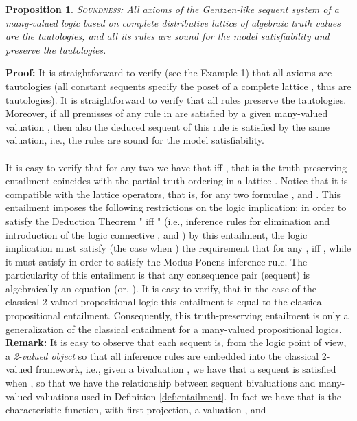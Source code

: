 \documentclass[10pt,twocolumn]{article}
\newtheorem{propo}{Proposition}
\begin{document}
  \begin{propo} \textsc{Soundness:} \label{prop:sound}
 All  axioms of the Gentzen-like sequent system   of a many-valued logic  based on complete distributive lattice
  of algebraic truth values are the tautologies, and all its rules are sound for the model satisfiability and
 preserve the tautologies.
 \end{propo}
 \textbf{Proof:} It is straightforward to verify (see the Example 1) that all axioms are tautologies (all constant sequents
  specify the poset of a complete lattice , thus are tautologies). It is straightforward to verify that all rules preserve the tautologies.
  Moreover, if all premisses  of any rule in  are satisfied by a given many-valued valuation ,
  then also the deduced sequent of this rule is satisfied by the same valuation, i.e., the rules are sound for the model satisfiability.
  \\ \\
 It is easy to verify that for any two  we have that  iff , that is the truth-preserving entailment
 coincides with the partial truth-ordering in a lattice .
 Notice that
it is compatible with the lattice operators, that is, for any two formulae ,
  and .
 This entailment imposes the following restrictions on the logic implication: in order to satisfy the Deduction Theorem
 " iff "
 (i.e., inference rules for elimination and introduction of the logic connective ,
   and )
  by this entailment,
 the logic implication must satisfy (the case when ) the requirement that for any
 ,  iff , while
 it must satisfy  in order to satisfy the Modus Ponens inference rule.
 The particularity of this entailment is that any consequence pair (sequent)  is algebraically an equation  (or, ).
  It is easy to verify, that in the case of the classical 2-valued
 propositional logic this entailment is equal to the classical
 propositional entailment. Consequently, this truth-preserving entailment is
 only a generalization of the classical entailment for a many-valued
 propositional logics.\\
  \textbf{Remark:} It is easy to observe that each sequent is, from
 the logic point of view, a  \emph{2-valued object} so that all inference
 rules are embedded into the classical 2-valued framework, i.e., given a bivaluation ,
 we have that a sequent  is satisfied when , so that we have the relationship between sequent
  bivaluations and many-valued
 valuations  used in Definition \ref{def:entailment}.
 In fact we have that  is the characteristic function, with 
first projection, a valuation , and
\end{document}
